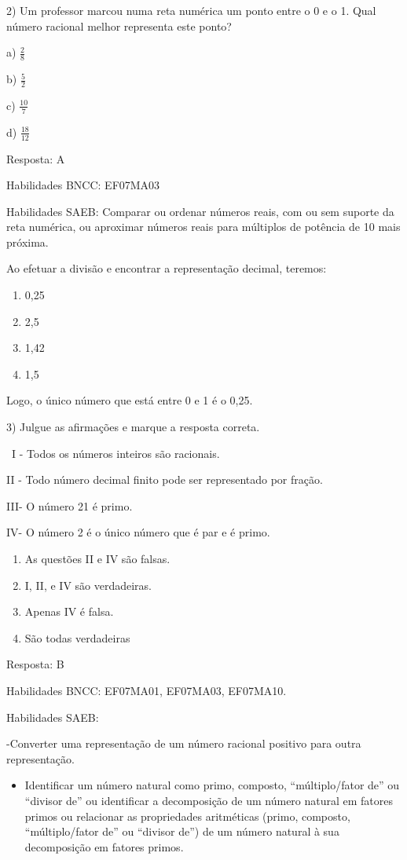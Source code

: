 {2) Um professor marcou numa reta numérica um ponto entre o 0 e o 1. Qual
número racional melhor representa este ponto?

a) \(\frac{2}{8}\)

b) \(\frac{5}{2}\)

c) \(\frac{10}{7}\)

d) \(\frac{18}{12}\)

Resposta: A

Habilidades BNCC: EF07MA03

Habilidades SAEB: Comparar ou ordenar números reais, com ou sem suporte
da reta numérica, ou aproximar números reais para múltiplos de potência
de 10 mais próxima.

Ao efetuar a divisão e encontrar a representação decimal, teremos:

\begin{enumerate}
\def\labelenumi{\alph{enumi})}
\item
  0,25
\item
  2,5
\item
  1,42
\item
  1,5
\end{enumerate}

Logo, o único número que está entre 0 e 1 é o 0,25.

3) Julgue as afirmações e marque a resposta correta.

~I - Todos os números inteiros são racionais.

II - Todo número decimal finito pode ser representado por fração.

III- O número 21 é primo.

IV- O número 2 é o único número que é par e é primo.

\begin{enumerate}
\def\labelenumi{\alph{enumi})}
\item
  As questões II e IV são falsas.
\item
  I, II, e IV são verdadeiras.
\item
  Apenas IV é falsa.
\item
  São todas verdadeiras
\end{enumerate}

Resposta: B

Habilidades BNCC: EF07MA01, EF07MA03, EF07MA10.

Habilidades SAEB:

-Converter uma representação de um número racional positivo para outra
representação.

\begin{itemize}
\tightlist
\item
  Identificar um número natural como primo, composto, ``múltiplo/fator
  de'' ou ``divisor de'' ou identificar a decomposição de um número
  natural em fatores primos ou relacionar as propriedades aritméticas
  (primo, composto, ``múltiplo/fator de'' ou ``divisor de'') de um
  número natural à sua decomposição em fatores primos.
\end{itemize}

}
